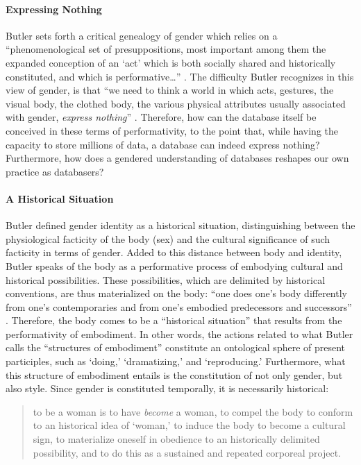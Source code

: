\paragraph{Expressing Nothing}
Butler sets forth a critical genealogy of gender which relies on a ``phenomenological set of presuppositions, most important among them the expanded conception of an `act' which is both socially shared and historically constituted, and which is performative\dots'' \parencite[530]{But88:Per}. The difficulty Butler recognizes in this view of gender, is that ``we need to think a world in which acts, gestures, the visual body, the clothed body, the various physical attributes usually associated with gender, \textit{express nothing}'' \parencite[530]{But88:Per}. Therefore, how can the database itself be conceived in these terms of performativity, to the point that, while having the capacity to store millions of data, a database can indeed express nothing? Furthermore, how does a gendered understanding of databases reshapes our own practice as databasers?

\paragraph{A Historical Situation}
Butler defined gender identity as a historical situation, distinguishing between the physiological facticity of the body (sex) and the cultural significance of such facticity in terms of gender. Added to this distance between body and identity, Butler speaks of the body as a performative process of embodying cultural and historical possibilities. These possibilities, which are delimited by historical conventions, are thus materialized on the body: ``one does one's body differently from one's contemporaries and from one's embodied predecessors and successors'' \parencite[521]{But88:Per}. Therefore, the body comes to be a ``historical situation'' that results from the performativity of embodiment. In other words, the actions related to what Butler calls the ``structures of embodiment'' constitute an ontological sphere of present participles, such as `doing,' `dramatizing,' and `reproducing.' Furthermore, what this structure of embodiment entails is the constitution of not only gender, but also style. Since gender is constituted temporally, it is necessarily historical:

\begin{quote}
	to be a woman is to have \textit{become} a woman, to compel the body to conform to an historical idea of `woman,' to induce the body to become a cultural sign, to materialize oneself in obedience to an historically delimited possibility, and to do this as a sustained and repeated corporeal project. \parencite[521]{But88:Per}
\end{quote}

